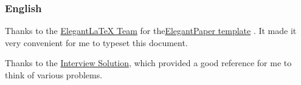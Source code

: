 \documentclass[lang=cn,11pt,a4paper]{elegantpaper}
\begin{document}
\subsubsection{English}
Thanks to the \href{https://elegantlatex.org/}{ElegantLaTeX Team}  for the\href{https://github.com/ElegantLaTeX/ElegantPaper}{ElegantPaper template} . It made it very convenient for me to typeset this document.

Thanks to the \href{https://hatodove22.notion.site/16f0eba93f3c4153bd1f770892aaf6b1}{Interview Solution}, which provided a good reference for me to think of various problems.


\nocite{*}

\end{document}
